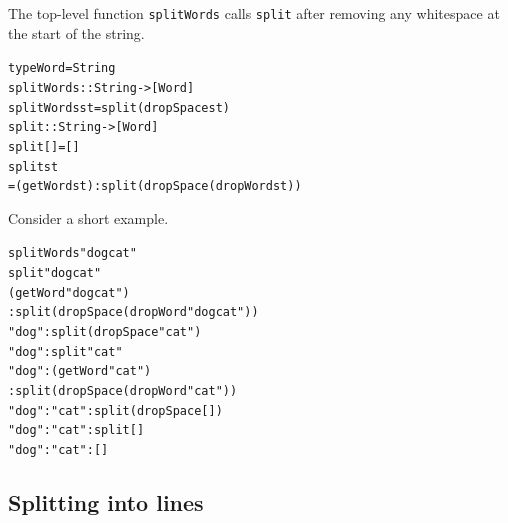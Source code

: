 The top-level function \texttt{splitWords} calls \texttt{split} after removing any
whitespace at the start of the string. 
\begin{alltt}
type Word = String
\bl
splitWords :: String -> [Word]
splitWords st = split (dropSpace st)
\bl
split :: String -> [Word]
split [] = []
split st
  = (getWord st) : split (dropSpace (dropWord st))
\end{alltt}
Consider a short example.
\begin{alltt}
splitWords "  dog cat"
\step split "dog cat"
\step (getWord "dog cat")
         : split (dropSpace (dropWord "dog cat"))
\step "dog" : split (dropSpace " cat")
\step "dog" : split "cat"
\step "dog" : (getWord "cat")
         : split (dropSpace (dropWord "cat"))
\step "dog" : "cat" : split (dropSpace [])
\step "dog" : "cat" : split []
\step "dog" : "cat" : []
\end{alltt}

\subsection*{Splitting into lines}

